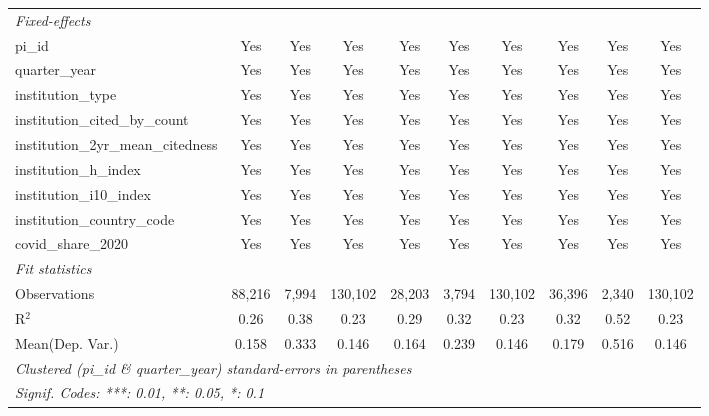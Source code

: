\begin{tabular}{lccccccccc}
   \midrule
   \emph{Fixed-effects}\\
   pi\_id                                                      & Yes            & Yes            & Yes            & Yes            & Yes           & Yes            & Yes            & Yes            & Yes\\  
   quarter\_year                                               & Yes            & Yes            & Yes            & Yes            & Yes           & Yes            & Yes            & Yes            & Yes\\  
   institution\_type                                           & Yes            & Yes            & Yes            & Yes            & Yes           & Yes            & Yes            & Yes            & Yes\\  
   institution\_cited\_by\_count                               & Yes            & Yes            & Yes            & Yes            & Yes           & Yes            & Yes            & Yes            & Yes\\  
   institution\_2yr\_mean\_citedness                           & Yes            & Yes            & Yes            & Yes            & Yes           & Yes            & Yes            & Yes            & Yes\\  
   institution\_h\_index                                       & Yes            & Yes            & Yes            & Yes            & Yes           & Yes            & Yes            & Yes            & Yes\\  
   institution\_i10\_index                                     & Yes            & Yes            & Yes            & Yes            & Yes           & Yes            & Yes            & Yes            & Yes\\  
   institution\_country\_code                                  & Yes            & Yes            & Yes            & Yes            & Yes           & Yes            & Yes            & Yes            & Yes\\  
   covid\_share\_2020                                          & Yes            & Yes            & Yes            & Yes            & Yes           & Yes            & Yes            & Yes            & Yes\\  
   \midrule
   \emph{Fit statistics}\\
   Observations                                                & 88,216         & 7,994          & 130,102        & 28,203         & 3,794         & 130,102        & 36,396         & 2,340          & 130,102\\  
   R$^2$                                                       & 0.26           & 0.38           & 0.23           & 0.29           & 0.32          & 0.23           & 0.32           & 0.52           & 0.23\\  
Mean(Dep. Var.) & 0.158 & 0.333 & 0.146 & 0.164 & 0.239 & 0.146 & 0.179 & 0.516 & 0.146 \\
   \midrule \midrule
   \multicolumn{10}{l}{\emph{Clustered (pi\_id \& quarter\_year) standard-errors in parentheses}}\\
   \multicolumn{10}{l}{\emph{Signif. Codes: ***: 0.01, **: 0.05, *: 0.1}}\\
\end{tabular}
\par\endgroup
